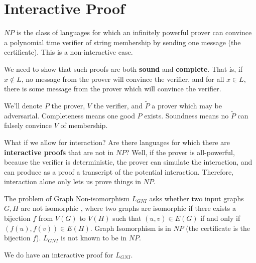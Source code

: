 







\section*{Interactive Proof}

$NP$ is the class of languages for which an infinitely powerful prover can convince a polynomial time verifier of string membership by sending one message (the certificate).  This is a non-interactive case.



We need to show that such proofs are both \textbf{sound} and \textbf{complete}.  That is, if $x\notin L$, no message from the prover will convince the verifier, and for all $x\in L$, there is some message from the prover which will convince the verifier.

We'll denote $P$ the prover, $V$ the verifier, and $\tilde{P}$ a prover which may be adversarial.  Completeness means one good $P$ exists.  Soundness means no $\tilde{P}$ can falsely convince $V$ of membership.

What if we allow for interaction?  Are there languages for which there are \textbf{interactive proofs} that are not in $NP$?  Well, if the prover is all-powerful, because the verifier is deterministic, the prover can simulate the interaction, and can produce as a proof a transcript of the potential interaction.  Therefore, interaction alone only lets us prove things in $NP$.

The problem of Graph Non-isomorphism $L_{GNI}$ asks whether two input graphs $G,H$ are not isomorphic , where two graphs are isomorphic if there exists a bijection $f$ from $V(G)$ to $V(H)$ such that $(u,v)\in E(G)$ if and only if $(f(u),f(v))\in E(H)$.  Graph Isomorphism is in $NP$ (the certificate is the bijection $f$).  $L_{GNI}$ is not known to be in $NP$.

We do have an interactive proof for $L_{GNI}$.

